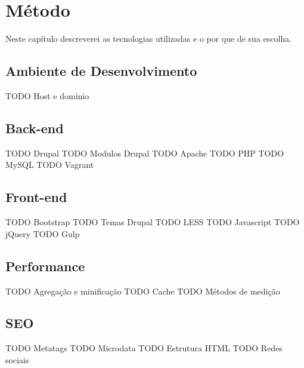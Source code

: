 \chapter{Método}

Neste capítulo descreverei as tecnologias utilizadas e o por que de sua escolha.

\section{Ambiente de Desenvolvimento}

TODO Host e dominio


\section{Back-end}

TODO Drupal
TODO Modulos Drupal
TODO Apache
TODO PHP
TODO MySQL
TODO Vagrant


\section{Front-end}

TODO Bootstrap
TODO Temas Drupal
TODO LESS
TODO Javascript
TODO jQuery
TODO Gulp


\section{Performance}

TODO Agregação e minificação
TODO Cache
TODO Métodos de medição

\section{SEO}

TODO Metatags
TODO Microdata
TODO Estrutura HTML
TODO Redes sociais

